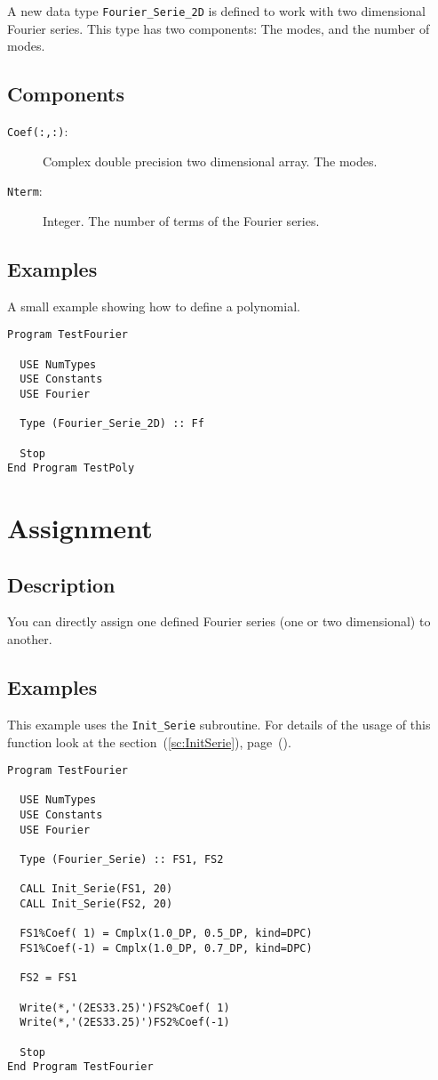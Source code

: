 A new data type \texttt{Fourier\_Serie\_2D} is defined to work with
two dimensional Fourier series. This type has two components: The
modes, and the number of modes.

\subsection{Components}

\begin{description}
\item[\texttt{Coef(:,:)}: ] Complex double precision two dimensional
  array. The modes.
\item[\texttt{Nterm}:] Integer. The number of terms of the Fourier
  series. 
\end{description}

\subsection{Examples}

A small example showing how to define a polynomial.

\begin{verbatim}
Program TestFourier

  USE NumTypes
  USE Constants
  USE Fourier

  Type (Fourier_Serie_2D) :: Ff

  Stop
End Program TestPoly
\end{verbatim}

\section{Assignment}

\subsection{Description}

You can directly assign one defined Fourier series (one or two
dimensional) to another.

\subsection{Examples}

This example uses the \texttt{Init\_Serie} subroutine. For details of
the usage of this function look at the section~(\ref{sc:InitSerie}),
page~(\pageref{sc:InitSerie}). 

\begin{verbatim}
Program TestFourier

  USE NumTypes
  USE Constants
  USE Fourier

  Type (Fourier_Serie) :: FS1, FS2

  CALL Init_Serie(FS1, 20)
  CALL Init_Serie(FS2, 20)

  FS1%Coef( 1) = Cmplx(1.0_DP, 0.5_DP, kind=DPC)
  FS1%Coef(-1) = Cmplx(1.0_DP, 0.7_DP, kind=DPC)

  FS2 = FS1

  Write(*,'(2ES33.25)')FS2%Coef( 1)
  Write(*,'(2ES33.25)')FS2%Coef(-1)

  Stop
End Program TestFourier
\end{verbatim}

